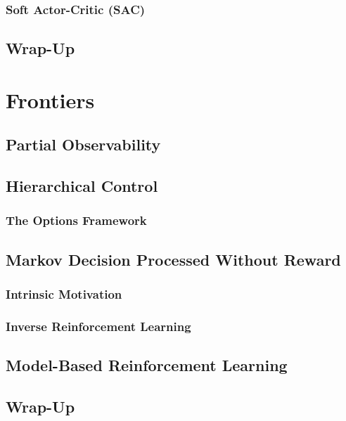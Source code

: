 		\subsection{Soft Actor-Critic (SAC)} %

	\section{Wrap-Up} %

\chapter{Frontiers} %

	\section{Partial Observability} %

	\section{Hierarchical Control} %

		\subsection{The Options Framework} %

	\section{Markov Decision Processed Without Reward} %

		\subsection{Intrinsic Motivation} %

		\subsection{Inverse Reinforcement Learning} %

	\section{Model-Based Reinforcement Learning} %

	\section{Wrap-Up} %
